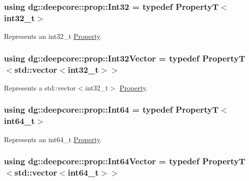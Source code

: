 \subsubsection[{\texorpdfstring{Int32}{Int32}}]{\setlength{\rightskip}{0pt plus 5cm}using {\bf dg\+::deepcore\+::prop\+::\+Int32} = typedef PropertyT$<$int32\+\_\+t$>$}\hypertarget{group___process_properties_gaccf8e71b795f75082ef758708db84edd}{}\label{group___process_properties_gaccf8e71b795f75082ef758708db84edd}


Represents an {\ttfamily int32\+\_\+t} \hyperlink{classdg_1_1deepcore_1_1_property}{Property}. 

\subsubsection[{\texorpdfstring{Int32\+Vector}{Int32Vector}}]{\setlength{\rightskip}{0pt plus 5cm}using {\bf dg\+::deepcore\+::prop\+::\+Int32\+Vector} = typedef PropertyT$<$std\+::vector$<$int32\+\_\+t$>$$>$}\hypertarget{group___process_properties_gaa7c9adb7a8c1d38311c39122a846e5d8}{}\label{group___process_properties_gaa7c9adb7a8c1d38311c39122a846e5d8}


Represents a {\ttfamily std\+::vector$<$int32\+\_\+t$>$} \hyperlink{classdg_1_1deepcore_1_1_property}{Property}. 

\subsubsection[{\texorpdfstring{Int64}{Int64}}]{\setlength{\rightskip}{0pt plus 5cm}using {\bf dg\+::deepcore\+::prop\+::\+Int64} = typedef PropertyT$<$int64\+\_\+t$>$}\hypertarget{group___process_properties_ga14986faaf41e6ead7ab0b1be59e40d00}{}\label{group___process_properties_ga14986faaf41e6ead7ab0b1be59e40d00}


Represents an {\ttfamily int64\+\_\+t} \hyperlink{classdg_1_1deepcore_1_1_property}{Property}. 

\subsubsection[{\texorpdfstring{Int64\+Vector}{Int64Vector}}]{\setlength{\rightskip}{0pt plus 5cm}using {\bf dg\+::deepcore\+::prop\+::\+Int64\+Vector} = typedef PropertyT$<$std\+::vector$<$int64\+\_\+t$>$$>$}\hypertarget{group___process_properties_gab516177437a5ae217122405549846532}{}\label{group___process_properties_gab516177437a5ae217122405549846532}


